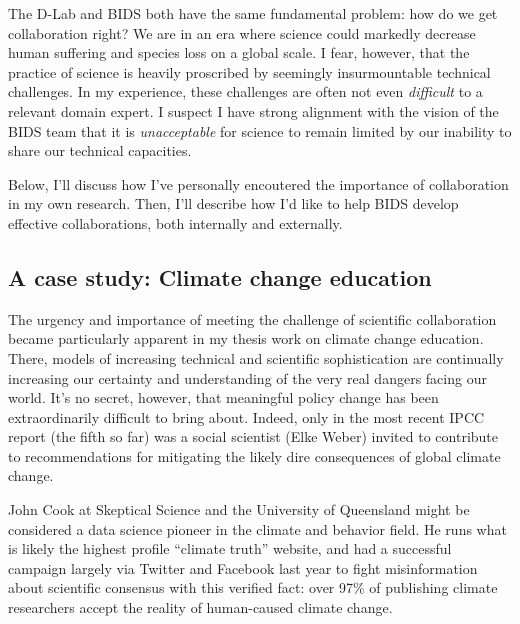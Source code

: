 \documentclass[12pt]{article}
\begin{document}
The D-Lab and BIDS both have the same fundamental problem: how do we get
collaboration right? We are in an era where science could markedly decrease
human suffering and species loss on a global scale. I fear, however, that the
practice of science is heavily proscribed by seemingly insurmountable technical
challenges. In my experience, these challenges are often not even
\emph{difficult} to a relevant domain expert.
I suspect I have strong alignment
with the vision of the BIDS team that it is \emph{unacceptable} for science to
remain limited by our inability to share our technical capacities.


Below, I'll discuss how I've personally encoutered the importance of
collaboration in my own research. Then, I'll describe how I'd like to help BIDS
develop effective collaborations, both internally and externally.

\subsection*{A case study: Climate change education}

The urgency and importance of meeting the challenge of scientific collaboration
became particularly apparent in my thesis work on climate change education.
There, models of increasing technical and scientific sophistication are
continually increasing our certainty and understanding of the very real dangers
facing our world. It's no secret, however, that meaningful policy change has
been extraordinarily difficult to bring about. Indeed, only in the most recent
IPCC report (the fifth so far) was a social scientist (Elke Weber) invited to
contribute to recommendations for mitigating the likely dire consequences of
global climate change.

John Cook at Skeptical Science and the University of Queensland might be
considered a data science pioneer in the climate and behavior field. He runs
what is likely the highest profile “climate truth” website, and had a successful
campaign largely via Twitter and Facebook last year to fight misinformation
about scientific consensus with this verified fact: over 97\% of publishing
climate researchers accept the reality of human-caused climate change.
\end{document}
